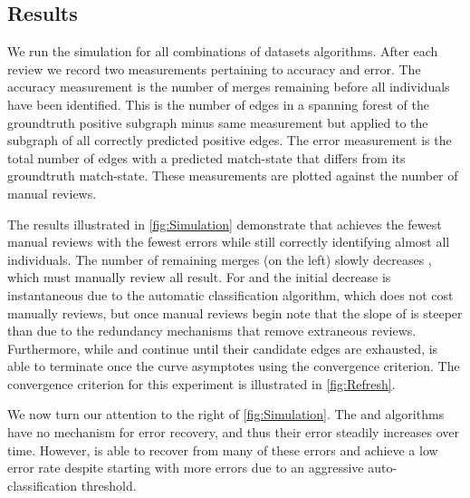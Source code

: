     \subsection{Results}

    We run the simulation for all combinations of datasets algorithms.
    After each review we record two measurements pertaining to accuracy and error.
    The accuracy measurement is the number of merges remaining before all individuals have been identified.
    This is the number of edges in a spanning forest of the groundtruth positive subgraph minus same measurement
      but applied to the subgraph of all correctly predicted positive edges.
    The error measurement is the total number of edges with a predicted match-state that differs from its
      groundtruth match-state.
    These measurements are plotted against the number of manual reviews.

    \Simulation{}

    \Refresh{}

    The results illustrated in \cref{fig:Simulation} demonstrate that  achieves the fewest manual
      reviews with the fewest errors while still correctly identifying almost all individuals.
    The number of remaining merges (on the left) slowly decreases , which must manually review all
      result.
    For  and  the initial decrease is instantaneous due to the automatic
      classification algorithm, which does not cost manually reviews, but once manual reviews begin note that the
      slope of  is steeper than  due to the redundancy mechanisms that remove extraneous
      reviews.
    Furthermore, while  and  continue until their candidate edges are exhausted,
       is able to terminate once the curve asymptotes using the convergence criterion.
    The convergence criterion for this experiment is illustrated in \cref{fig:Refresh}.

    We now turn our attention to the right of \cref{fig:Simulation}.
    The  and  algorithms have no mechanism for error recovery, and thus their error
      steadily increases over time.
    However,  is able to recover from many of these errors and achieve a low error rate despite
      starting with more errors due to an aggressive auto-classification threshold.

